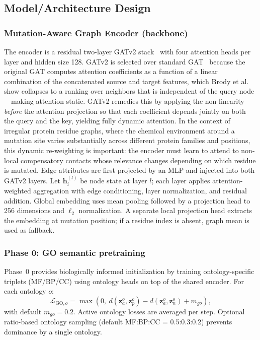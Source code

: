 \documentclass[11pt,a4paper]{article}
\begin{document}
\subsection{Model/Architecture Design}

\subsubsection{Mutation-Aware Graph Encoder (backbone)}
\label{sec:encoder-backbone}
The encoder is a residual two-layer GATv2 stack~\cite{brody2022how} with four attention heads per layer and hidden size 128. GATv2 is selected over standard GAT~\cite{velickovic2018gat} because the original GAT computes attention coefficients as a function of a linear combination of the concatenated source and target features, which Brody et al.~\cite{brody2022how} show collapses to a ranking over neighbors that is independent of the query node—making attention static. GATv2 remedies this by applying the non-linearity \emph{before} the attention projection so that each coefficient depends jointly on both the query and the key, yielding fully dynamic attention. In the context of irregular protein residue graphs, where the chemical environment around a mutation site varies substantially across different protein families and positions, this dynamic re-weighting is important: the encoder must learn to attend to non-local compensatory contacts whose relevance changes depending on which residue is mutated. Edge attributes are first projected by an MLP and injected into both GATv2 layers. Let $\mathbf{h}_i^{(l)}$ be node state at layer $l$; each layer applies attention-weighted aggregation with edge conditioning, layer normalization, and residual addition. Global embedding uses mean pooling followed by a projection head to 256 dimensions and $\ell_2$ normalization. A separate local projection head extracts the embedding at mutation position; if a residue index is absent, graph mean is used as fallback.

\subsubsection{Phase 0: GO semantic pretraining}
Phase~0 provides biologically informed initialization by training ontology-specific triplets (MF/BP/CC) using ontology heads on top of the shared encoder. For each ontology $o$:
\[
\mathcal{L}_{\text{GO},o}=\max(0,\ d(\mathbf{z}_a^o,\mathbf{z}_p^o)-d(\mathbf{z}_a^o,\mathbf{z}_n^o)+m_{go}),
\]
with default $m_{go}=0.2$. Active ontology losses are averaged per step. Optional ratio-based ontology sampling (default MF:BP:CC = 0.5:0.3:0.2) prevents dominance by a single ontology.
\end{document}
